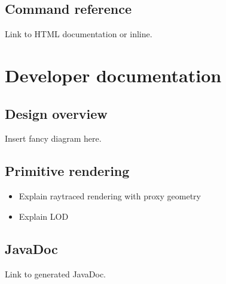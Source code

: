\documentclass{scrartcl}
\begin{document}
\subsection{Command reference}

Link to HTML documentation or inline.

\section{Developer documentation}

\subsection{Design overview}

Insert fancy diagram here.

\subsection{Primitive rendering}

\begin{itemize}
\item Explain raytraced rendering with proxy geometry
\item Explain LOD
\end{itemize}

\subsection{JavaDoc}

Link to generated JavaDoc.
\end{document}
